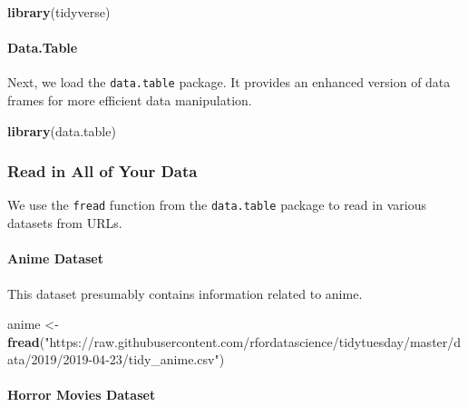 \documentclass[
]{book}
\newenvironment{Shaded}{\begin{snugshade}}{\end{snugshade}}
\newcommand{\FunctionTok}[1]{\textcolor[rgb]{0.13,0.29,0.53}{\textbf{#1}}}
\newcommand{\NormalTok}[1]{#1}
\newcommand{\OtherTok}[1]{\textcolor[rgb]{0.56,0.35,0.01}{#1}}
\newcommand{\StringTok}[1]{\textcolor[rgb]{0.31,0.60,0.02}{#1}}
\begin{document}
\begin{Shaded}
\begin{Highlighting}[]
\FunctionTok{library}\NormalTok{(tidyverse)}
\end{Highlighting}
\end{Shaded}

\hypertarget{data.table}{%
\paragraph*{Data.Table}\label{data.table}}

Next, we load the \texttt{data.table} package. It provides an enhanced version of data frames for more efficient data manipulation.

\begin{Shaded}
\begin{Highlighting}[]
\FunctionTok{library}\NormalTok{(data.table)}
\end{Highlighting}
\end{Shaded}

\hypertarget{read-in-all-of-your-data}{%
\subsubsection*{Read in All of Your Data}\label{read-in-all-of-your-data}}

We use the \texttt{fread} function from the \texttt{data.table} package to read in various datasets from URLs.

\hypertarget{anime-dataset}{%
\paragraph*{Anime Dataset}\label{anime-dataset}}

This dataset presumably contains information related to anime.

\begin{Shaded}
\begin{Highlighting}[]
\NormalTok{anime }\OtherTok{\textless{}{-}} \FunctionTok{fread}\NormalTok{(}\StringTok{"https://raw.githubusercontent.com/rfordatascience/tidytuesday/master/data/2019/2019{-}04{-}23/tidy\_anime.csv"}\NormalTok{)}
\end{Highlighting}
\end{Shaded}

\hypertarget{horror-movies-dataset}{%
\paragraph*{Horror Movies Dataset}\label{horror-movies-dataset}}
\end{document}
